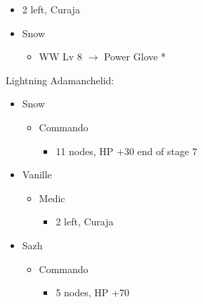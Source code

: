 \begin{multicols}{2}
\begin{menu}
\begin{itemize}
\begin{itemize}
\begin{itemize}
\begin{itemize}
                        \item 2 left, Curaja
                      \end{itemize}
              \end{itemize}
      \end{itemize}
      \equip
      \begin{itemize}
        \item Snow
              \begin{itemize}
                \item WW Lv 8 $\rightarrow$ Power Glove *
              \end{itemize}
      \end{itemize}
    \end{itemize}
  \end{menu}
  \vfill
  \columnbreak
  \begin{center}
    Lightning Adamanchelid:
  \end{center}
  \begin{menu}
    \begin{itemize}
      \crystarium
      \begin{itemize}
        \item Snow
              \begin{itemize}
                \item Commando
                      \begin{itemize}
                        \item 11 nodes, HP +30 end of stage 7
                      \end{itemize}
              \end{itemize}
        \item Vanille
              \begin{itemize}
                \item Medic
                      \begin{itemize}
                        \item 2 left, Curaja
                      \end{itemize}
              \end{itemize}
        \item Sazh
              \begin{itemize}
                \item Commando
                      \begin{itemize}
                        \item 5 nodes, HP +70
                      \end{itemize}

\end{itemize}
\end{itemize}
\end{itemize}
\end{menu}
\end{multicols}
